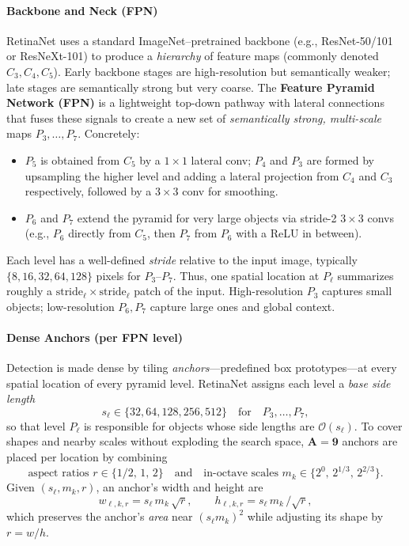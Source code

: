 \paragraph{Backbone and Neck (FPN)}
RetinaNet uses a standard ImageNet–pretrained backbone (e.g., ResNet-50/101 or ResNeXt-101) to produce a \emph{hierarchy} of feature maps (commonly denoted \(C_3,C_4,C_5\)). Early backbone stages are high-resolution but semantically weaker; late stages are semantically strong but very coarse. The \textbf{Feature Pyramid Network (FPN)} is a lightweight top-down pathway with lateral connections that fuses these signals to create a new set of \emph{semantically strong, multi-scale} maps \(P_3,\dots,P_7\). Concretely:
\begin{itemize}
	\item \(P_5\) is obtained from \(C_5\) by a \(1{\times}1\) lateral conv; \(P_4\) and \(P_3\) are formed by upsampling the higher level and adding a lateral projection from \(C_4\) and \(C_3\) respectively, followed by a \(3{\times}3\) conv for smoothing.
	\item \(P_6\) and \(P_7\) extend the pyramid for very large objects via stride-2 \(3{\times}3\) convs (e.g., \(P_6\) directly from \(C_5\), then \(P_7\) from \(P_6\) with a ReLU in between).
\end{itemize}
Each level has a well-defined \emph{stride} relative to the input image, typically
\(\{8,16,32,64,128\}\) pixels for \(P_3\)–\(P_7\). Thus, one spatial location at \(P_\ell\) summarizes roughly a \(\text{stride}_\ell \times \text{stride}_\ell\) patch of the input. High-resolution \(P_3\) captures small objects; low-resolution \(P_6,P_7\) capture large ones and global context.

\paragraph{Dense Anchors (per FPN level)}
Detection is made dense by tiling \emph{anchors}—predefined box prototypes—at every spatial location of every pyramid level. RetinaNet assigns each level a \emph{base side length}
\[
s_\ell \in \{32,64,128,256,512\}\quad\text{for}\quad P_3,\dots,P_7,
\]
so that level \(P_\ell\) is responsible for objects whose side lengths are \(\mathcal{O}(s_\ell)\). To cover shapes and nearby scales without exploding the search space, \(\mathbf{A=9}\) anchors are placed per location by combining
\[
\text{aspect ratios } r \in \{1/2,\,1,\,2\}\quad\text{and}\quad
\text{in-octave scales } m_k \in \{2^{0},\,2^{1/3},\,2^{2/3}\}.
\]
Given \((s_\ell,m_k,r)\), an anchor’s width and height are
\[
w_{\ell,k,r} = s_\ell\, m_k\, \sqrt{r},\qquad
h_{\ell,k,r} = s_\ell\, m_k\, / \sqrt{r},
\]
which preserves the anchor’s \emph{area} near \((s_\ell m_k)^2\) while adjusting its shape by \(r=w/h\).


